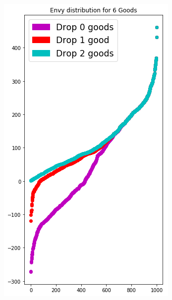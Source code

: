\begin{figure}[h!]
\begin{subfigure}[b]{0.47\linewidth}
    \includegraphics[width=\linewidth]{images/envy_density/envy_density_us16.png}
    \caption{}
  \end{subfigure}
  \begin{subfigure}[b]{0.47\linewidth}

\end{subfigure}
\end{figure}
